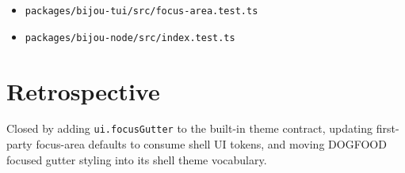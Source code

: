 \begin{itemize}
\item
  \texttt{p\allowbreak{}a\allowbreak{}c\allowbreak{}k\allowbreak{}a\allowbreak{}g\allowbreak{}e\allowbreak{}s\allowbreak{}/\allowbreak{}b\allowbreak{}i\allowbreak{}j\allowbreak{}o\allowbreak{}u\allowbreak{}-\allowbreak{}t\allowbreak{}u\allowbreak{}i\allowbreak{}/\allowbreak{}s\allowbreak{}r\allowbreak{}c\allowbreak{}/\allowbreak{}f\allowbreak{}o\allowbreak{}c\allowbreak{}u\allowbreak{}s\allowbreak{}-\allowbreak{}a\allowbreak{}r\allowbreak{}e\allowbreak{}a\allowbreak{}.\allowbreak{}t\allowbreak{}e\allowbreak{}s\allowbreak{}t\allowbreak{}.\allowbreak{}t\allowbreak{}s}
\item
  \texttt{p\allowbreak{}a\allowbreak{}c\allowbreak{}k\allowbreak{}a\allowbreak{}g\allowbreak{}e\allowbreak{}s\allowbreak{}/\allowbreak{}b\allowbreak{}i\allowbreak{}j\allowbreak{}o\allowbreak{}u\allowbreak{}-\allowbreak{}n\allowbreak{}o\allowbreak{}d\allowbreak{}e\allowbreak{}/\allowbreak{}s\allowbreak{}r\allowbreak{}c\allowbreak{}/\allowbreak{}i\allowbreak{}n\allowbreak{}d\allowbreak{}e\allowbreak{}x\allowbreak{}.\allowbreak{}t\allowbreak{}e\allowbreak{}s\allowbreak{}t\allowbreak{}.\allowbreak{}t\allowbreak{}s}
\end{itemize}

\section{Retrospective}\label{record-177-retrospective}

Closed by adding \texttt{u\allowbreak{}i\allowbreak{}.\allowbreak{}f\allowbreak{}o\allowbreak{}c\allowbreak{}u\allowbreak{}s\allowbreak{}G\allowbreak{}u\allowbreak{}t\allowbreak{}t\allowbreak{}e\allowbreak{}r} to the built-in theme contract, updating first-party focus-area defaults to consume shell UI tokens, and moving DOGFOOD focused gutter styling into its shell theme vocabulary.

